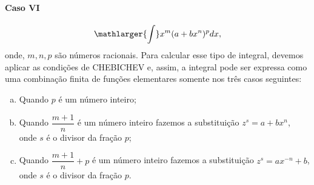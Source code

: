 \cleardoublepage\documentclass[../main.tex]{subfiles}
\begin{document}
\paragraph*{Caso VI}
\[ \mathlarger{\int} x^m(a+bx^n)^p dx, \]
onde, \(m,n,p\) são números racionais. Para calcular esse tipo de integral, devemos aplicar as condições de CHEBICHEV e, assim, a integral pode ser expressa como uma combinação finita de funções elementares somente nos três casos seguintes:

\begin{enumerate}[a.]
    \item Quando \(p\) é um número inteiro;

\item Quando \(\dfrac{m+1}{n}\) é um número inteiro fazemos a substituição \(z^s=a+bx^n\), onde \(s\) é o divisor da fração \(p\);

\item Quando \(\dfrac{m+1}{n}+p\) é um número inteiro fazemos a substituição \(z^{s}=ax^{-n}+b\), onde \(s\) é o divisor da fração \(p\).
\end{enumerate}
\end{document}
